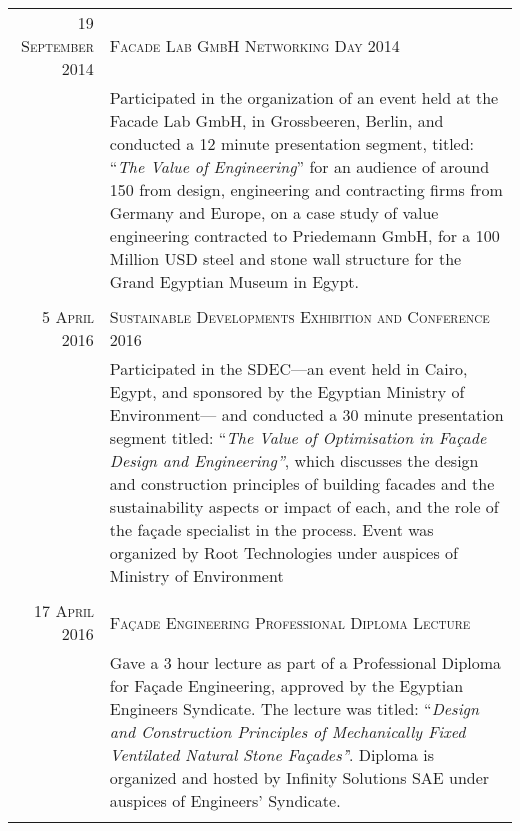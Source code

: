 \documentclass[a4paper,11pt]{article} %
\begin{document}
\begin{tabular}{r|p{11cm}}
\textsc{19 September 2014} & \textsc{Facade Lab GmbH Networking Day 2014}\\ 
& \footnotesize{Participated in the organization of an event held at the Facade Lab GmbH, in Grossbeeren, Berlin, and conducted a 12 minute presentation segment, titled: ``\emph{The Value of Engineering}'' for an audience of around 150 from design, engineering and contracting firms from Germany and Europe, on a case study of value engineering contracted to Priedemann GmbH, for a 100 Million USD steel and stone wall structure for the Grand Egyptian Museum in Egypt.}\\
\multicolumn{2}{c}{} \\

\textsc{5 April 2016} & \textsc{Sustainable Developments Exhibition and Conference 2016}\\ 
& \footnotesize{Participated in the SDEC---an event held in Cairo, Egypt, and sponsored by the Egyptian Ministry of Environment--- and conducted a 30 minute presentation segment titled: ``\emph{The Value of Optimisation in Fa\c{c}ade Design and Engineering''}, which discusses the design and construction principles of building facades and the sustainability aspects or impact of each, and the role of the fa\c{c}ade specialist in the process. Event was organized by Root Technologies under auspices of Ministry of Environment}\\
\multicolumn{2}{c}{} \\

\textsc{17 April 2016} & \textsc{Fa\c{c}ade Engineering Professional Diploma Lecture}\\ 
& \footnotesize{Gave a 3 hour lecture as part of a Professional Diploma for Fa\c{c}ade Engineering, approved by the Egyptian Engineers Syndicate. The lecture was titled: ``\emph{Design and Construction Principles of Mechanically Fixed Ventilated Natural Stone Fa\c{c}ades'}'. Diploma is organized and hosted by Infinity Solutions SAE under auspices of Engineers' Syndicate.}\\
\multicolumn{2}{c}{} \\

\end{tabular}

\end{document}

